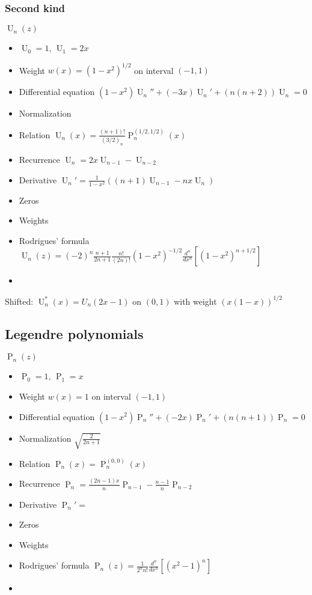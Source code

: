 \documentclass[10pt,dvipdfmx,letterpaper,twoside]{article}
\let\O=\operatorname
\begin{document}
\subsubsection{Second kind}
$\O{U}_n(z)$
\begin{itemize}
\item $\O{U}_0 = 1$, $\O{U}_1 = 2x$
\item Weight $w(x) = (1-x^2)^{1/2}$ on interval $(-1,1)$
\item Differential equation $\left(1-x^2\right) \O{U}_n'' + \left(-3x\right) \O{U}_n' + \left(n(n+2)\right) \O{U}_n = 0$
\item Normalization $ $
\item Relation $\O{U}_n(x) = \frac{(n+1)!}{(3/2)_n} \O{P}_n^{(1/2, 1/2)}(x)$
\item Recurrence $\O{U}_n = 2 x \O{U}_{n-1} - \O{U}_{n-2}$
\item Derivative $\O{U}_n' = \frac{1}{1-x^2}\left( (n+1)\O{U}_{n-1} - n x \O{U}_{n} \right)$
\item Zeros
\item Weights
\item Rodrigues' formula $\O{U}_n(z) = (-2)^n\frac{n+1}{2n+1}\frac{n!}{(2n)!} (1-x^2)^{-1/2} \frac{d^n}{dx^n}\left[ (1-x^2)^{n+1/2} \right]$
\item 
\end{itemize}
Shifted: $\O{U}^*_n(x) = U_n(2x-1)$ on $(0,1)$ with weight $(x(1-x))^{1/2}$

\subsection{Legendre polynomials}
$\O{P}_n(z)$
\begin{itemize}
\item $\O{P}_0 = 1$, $\O{P}_1 = x$
\item Weight $w(x) = 1$ on interval $(-1,1)$
\item Differential equation $\left(1-x^2\right) \O{P}_n'' + \left(-2x\right) \O{P}_n' + \left(n(n+1)\right) \O{P}_n = 0$
\item Normalization $\sqrt{\frac{2}{2n+1}}$
\item Relation $\O{P}_n(x) = \O{P}_n^{(0,0)}(x)$
\item Recurrence $\O{P}_n = \frac{(2n-1)x}{n}\O{P}_{n-1} - \frac{n-1}{n}\O{P}_{n-2}$
\item Derivative $\O{P}_n' = $
\item Zeros
\item Weights
\item Rodrigues' formula $\O{P}_n(z) = \frac{1}{2^n n!}\frac{d^n}{dx^n}\left[ (x^2-1)^n \right]$
\item 
\end{itemize}
\end{document}
